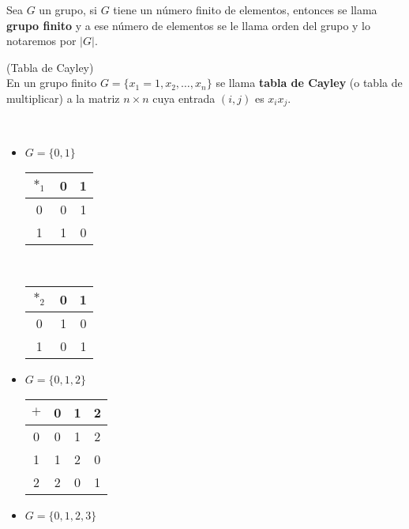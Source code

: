 \begin{definicion}
    Sea $G$ un grupo, si $G$ tiene un número finito de elementos, entonces se llama \textbf{grupo finito} y a ese número de elementos se le llama orden del grupo y lo notaremos por $|G|$.
\end{definicion}

\begin{definicion}
    (Tabla de Cayley)\\
    En un grupo finito $G=\{x_1=1, x_2, \dots, x_n\}$  se llama \textbf{tabla de Cayley} (o tabla de multiplicar) a la matriz $n\times n$ cuya entrada $(i,j)$ es $x_ix_j$.
\end{definicion}

\begin{ejemplo}\
    \begin{itemize}
        \item $G=\{0,1\}$

        \begin{tabular}{c|c|c|}
            $\ast_1$ & 0 & 1\\
            \hline
            0 & 0 & 1\\
            \hline
            1 & 1 & 0\\
            \hline
        \end{tabular}

        \ \\

        \begin{tabular}{c|c|c|}
            $\ast_2$ & 0 & 1\\
            \hline
            0 & 1 & 0\\
            \hline
            1 & 0 & 1\\
            \hline
        \end{tabular}

        \item $G=\{0,1,2\}$

        \begin{tabular}{c|c|c|c|}
            $+$ & 0 & 1 & 2\\
            \hline
            0 & 0 & 1 & 2\\
            \hline
            1 & 1 & 2 & 0\\
            \hline
            2 & 2 & 0 & 1\\
            \hline
        \end{tabular}

        \item $G=\{0,1,2,3\}$


\end{itemize}
\end{ejemplo}
